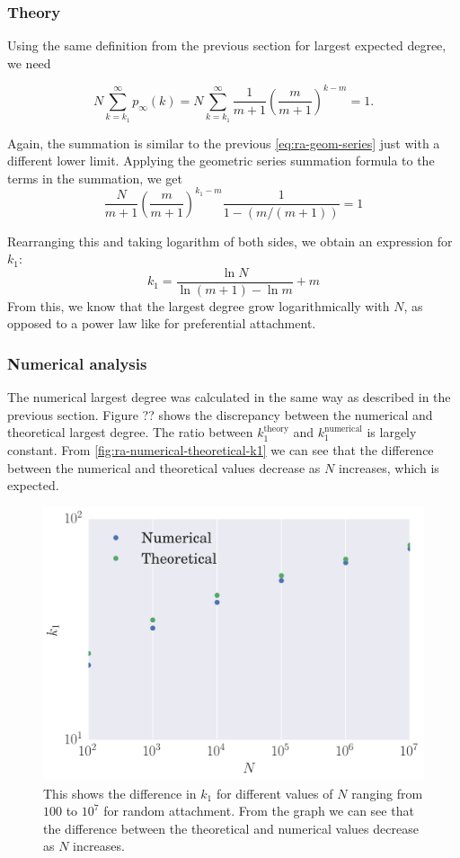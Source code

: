 \subsubsection{Theory}
Using the same definition from the previous section for largest expected degree, we need

\begin{equation}
	N \sum_{k=k_1}^\infty p_{\infty}(k) = N \sum_{k=k_1}^\infty \frac{1}{m+1} \left (\frac{m}{m+1} \right )^{k-m} = 1.
	\label{eq:largest-expected-degree-ra-criteria}
\end{equation}

Again, the summation is similar to the previous \autoref{eq:ra-geom-series} just with a different lower limit. Applying the geometric series summation formula to the terms in the summation, we get 
\begin{equation}
	\frac{N}{m+1} \left ( \frac{m}{m+1} \right )^{k_1 - m} \frac{1}{1 - (m / (m+1))} = 1
\end{equation}

Rearranging this and taking logarithm of both sides, we obtain an expression for $k_1$:
\begin{equation}
	k_1 = \frac{\ln N}{\ln (m+1) - \ln m} + m
	\label{eq:largest-degree-ra}
\end{equation}
From this, we know that the largest degree grow logarithmically with $N$, as opposed to a power law like for preferential attachment. 

\subsubsection{Numerical analysis}
The numerical largest degree was calculated in the same way as described in the previous section. Figure ?? shows the discrepancy between the numerical and theoretical largest degree. The ratio between $k_1^{\text{theory}}$ and $k_1^{\text{numerical}}$ is largely constant. From \autoref{fig:ra-numerical-theoretical-k1} we can see that the difference between the numerical and theoretical values decrease as $N$ increases, which is expected. 

\begin{figure}
    \centering
    \includegraphics[height=0.5\linewidth]{img/ra-numerical-theoretical-k1}
    \caption{This shows the difference in $k_1$ for different values of $N$ ranging from $100$ to $10^7$ for random attachment. From the graph we can see that the difference between the theoretical and numerical values decrease as $N$ increases.}
    \label{fig:ra-numerical-theoretical-k1}
\end{figure}

